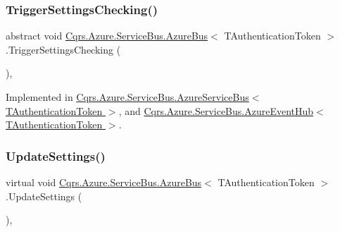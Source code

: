 \subsubsection{\texorpdfstring{Trigger\+Settings\+Checking()}{TriggerSettingsChecking()}}
{\footnotesize\ttfamily abstract void \hyperlink{classCqrs_1_1Azure_1_1ServiceBus_1_1AzureBus}{Cqrs.\+Azure.\+Service\+Bus.\+Azure\+Bus}$<$ T\+Authentication\+Token $>$.Trigger\+Settings\+Checking (\begin{DoxyParamCaption}{ }\end{DoxyParamCaption})\hspace{0.3cm}{\ttfamily [protected]}, {}}



Implemented in \hyperlink{classCqrs_1_1Azure_1_1ServiceBus_1_1AzureServiceBus_ae4b736019e332a81eb08d3696f8b6e7e_ae4b736019e332a81eb08d3696f8b6e7e}{Cqrs.\+Azure.\+Service\+Bus.\+Azure\+Service\+Bus$<$ T\+Authentication\+Token $>$}, and \hyperlink{classCqrs_1_1Azure_1_1ServiceBus_1_1AzureEventHub_a779ce1115cf00dfaf072056a6ad8f9fe_a779ce1115cf00dfaf072056a6ad8f9fe}{Cqrs.\+Azure.\+Service\+Bus.\+Azure\+Event\+Hub$<$ T\+Authentication\+Token $>$}.

\mbox{\label{classCqrs_1_1Azure_1_1ServiceBus_1_1AzureBus_aa41ae78c1e674cfd9316c573ca5d1bab_aa41ae78c1e674cfd9316c573ca5d1bab}} 
\subsubsection{\texorpdfstring{Update\+Settings()}{UpdateSettings()}}
{\footnotesize\ttfamily virtual void \hyperlink{classCqrs_1_1Azure_1_1ServiceBus_1_1AzureBus}{Cqrs.\+Azure.\+Service\+Bus.\+Azure\+Bus}$<$ T\+Authentication\+Token $>$.Update\+Settings (\begin{DoxyParamCaption}{ }\end{DoxyParamCaption})\hspace{0.3cm}{\ttfamily [protected]}, {\ttfamily [virtual]}}

\mbox{\label{classCqrs_1_1Azure_1_1ServiceBus_1_1AzureBus_a9fa1f5a74819100c40d8079ac6a6adb9_a9fa1f5a74819100c40d8079ac6a6adb9}} 
